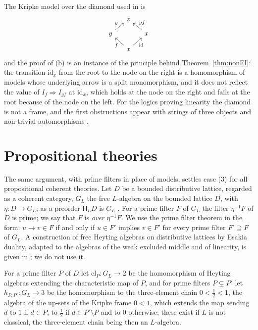 \documentclass[11pt]{amsart}
\theoremstyle{definition}
\newcommand{\HH}{\mathsf H}
\newcommand{\id}{\mathrm{id}}
\begin{document}
The Kripke model over the diamond used in \cite[Prop.~5.1]{Interm} is
\[
\begin{tikzcd}[column sep=small,row sep=small]
&z&\\
y\ar[ur,"g"]&&x\ar[ul,"gf"']\\
&x\ar[ul,"f"]\ar[ur,"\id"']&
\end{tikzcd}
\]
and the proof of (b) is an instance of the principle behind
Theorem~\ref{thm:nonEI}: the transition $\id_x$ from the root to the
node on the right is a homomorphism of models whose underlying arrow
is a split monomorphism, and it does not reflect the value of
$I_f\Rightarrow I_{gf}$ at $\id_x$, which holds at the node on the
right and fails at the root because of the node on the left. For the
logics proving linearity the diamond is not a frame, and the first
obstructions appear with strings of three objects and non-trivial
automorphisms \cite[\S6]{Strings}.

\section{Propositional theories}\label{sec:prop}

The same argument, with prime filters in place of models, settles
case (3) for all propositional coherent theories. Let $D$ be a bounded
distributive lattice, regarded as a coherent category, $G_L$ the free
$L$-algebra on the bounded lattice $D$, with $\eta\colon D\to G_L$; as
a preorder $\HH_LD$ is $G_L$ \cite[\S6]{Interm}. For a prime filter $F$
of $G_L$ the filter $\eta^{-1}F$ of $D$ is prime; we say that $F$ is
\emph{over} $\eta^{-1}F$. We use the prime filter theorem in the form:
$u\to v\in F$ if and only if $u\in F'$ implies $v\in F'$ for every
prime filter $F'\supseteq F$ of $G_L$. A construction of free
Heyting algebras on distributive lattices by Esakia duality, adapted
to the algebras of the weak excluded middle and of linearity, is
given in \cite{Almeida}; we do not use it.

For a prime filter $P$ of $D$ let $\mathrm{cl}_P\colon G_L\to2$ be the
homomorphism of Heyting algebras extending the characteristic map of
$P$, and for prime filters $P\subsetneq P'$ let $h_{P,P'}\colon G_L\to
3$ be the homomorphism to the three-element chain $0<\frac12<1$, the
algebra of the up-sets of the Kripke frame $0<1$, which extends the
map sending $d$ to $1$ if $d\in P$, to $\frac12$ if $d\in P'\setminus
P$ and to $0$ otherwise; these exist if $L$ is not classical, the
three-element chain being then an $L$-algebra.
\end{document}
